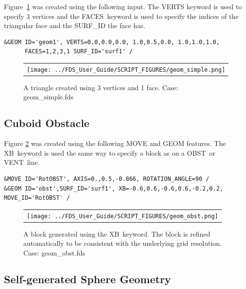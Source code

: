 \documentclass[11pt]{book}
\begin{document}
Figure~\ref{fig:geom_simple} was created using the following input. The {\ct VERTS} keyword is used to specify 3 vertices and the {\ct FACES}\ keyword is used to specify the indices of the triangular face and the {\ct SURF\_ID} the face has.
\begin{lstlisting}
&GEOM ID='geom1', VERTS=0.0,0.0,0.0, 1.0,0.5,0.0, 1.0,1.0,1.0,
      FACES=1,2,3,1 SURF_ID='surf1' /
\end{lstlisting}

\begin{figure}[!ht]
\begin{center}
\begin{tabular}{c}
 \texttt{[image: ../FDS\_User\_Guide/SCRIPT\_FIGURES/geom\_simple.png]}
  \end{tabular}
\end{center}
 \caption[Simple triangulated geometry]{A triangle created using 3 vertices and 1 face. Case: {\ct geom\_simple.fds}}
\label{fig:geom_simple}
\end{figure}


\subsection{Cuboid Obstacle}

Figure \ref{fig:geom_obst} was created using the following {\ct MOVE} and {\ct GEOM} features. The {\ct XB}\ keyword is used the same way to specify a block as on a {\ct OBST}\ or {\ct VENT}\ line.
\begin{lstlisting}
&MOVE ID='RotOBST', AXIS=0.,0.5,-0.866, ROTATION_ANGLE=90 /
&GEOM ID='obst',SURF_ID='surf1', XB=-0.6,0.6,-0.6,0.6,-0.2,0.2, MOVE_ID='RotOBST' /
\end{lstlisting}

\begin{figure}
\begin{center}
\begin{tabular}{c}
 \texttt{[image: ../FDS\_User\_Guide/SCRIPT\_FIGURES/geom\_obst.png]}
  \end{tabular}
\end{center}
 \caption[Block geometry using {\ct XB}]{A block generated using the {\ct XB}\ keyword.  The block is refined automatically to be consistent with the underlying grid resolution. Case: {\ct geom\_obst.fds}}
\label{fig:geom_obst}
\end{figure}

\FloatBarrier

\subsection{Self-generated Sphere Geometry}
\end{document}
